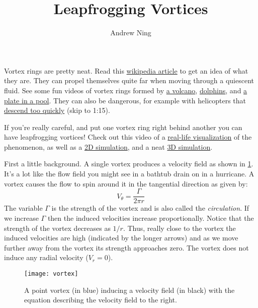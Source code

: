 \documentclass{article}
\begin{document}
\author{Andrew Ning}
\title{Leapfrogging Vortices}
\date{}  %
\maketitle

Vortex rings are pretty neat.  Read this \href{https://en.wikipedia.org/wiki/Vortex_ring}{wikipedia article} to get an idea of what they are.  They can propel themselves quite far when moving through a quiescent fluid.  See some fun videos of vortex rings formed by \href{https://www.youtube.com/watch?v=VbV98Z0QP-k}{a volcano}, \href{https://www.youtube.com/watch?v=ks3aQhEohTE}{dolphins}, and  \href{https://www.youtube.com/watch?v=72LWr7BU8Ao}{a plate in a pool}.  They can also be dangerous, for example with helicopters that \href{https://www.youtube.com/watch?v=wddpsnvu0PM}{descend too quickly} (skip to 1:15).

If you're really careful, and put one vortex ring right behind another you can have leapfrogging vortices!  Check out this video of a \href{https://youtu.be/Yydb9Mqg9TY}{real-life visualization} of the phenomenon, as well as a \href{https://youtu.be/0LP-MgrXtIM}{2D simulation}, and a neat \href{https://www.youtube.com/watch?v=SPBMEXX5xBI}{3D simulation}.

First a little background.  A single vortex produces a velocity field as shown in \cref{fig:vortex}.  It's a lot like the flow field you might see in a bathtub drain on in a hurricane.  A vortex causes the flow to spin around it in the tangential direction as given by:
\begin{equation}
V_\theta = \frac{\Gamma}{2 \pi r}
\end{equation}
The variable $\Gamma$ is the strength of the vortex and is also called the \emph{circulation}.  If we increase $\Gamma$ then the induced velocities increase proportionally.  Notice that the strength of the vortex decreases as $1/r$.  Thus, really close to the vortex the induced velocities are high (indicated by the longer arrows) and as we move further away from the vortex its strength approaches zero.  The vortex does not induce any radial velocity ($V_r = 0$).

\begin{figure}[htb]
\centering
\texttt{[image: vortex]}
\caption{A point vortex (in blue) inducing a velocity field (in black) with the equation describing the velocity field to the right.}
\label{fig:vortex}
\end{figure}
\end{document}
